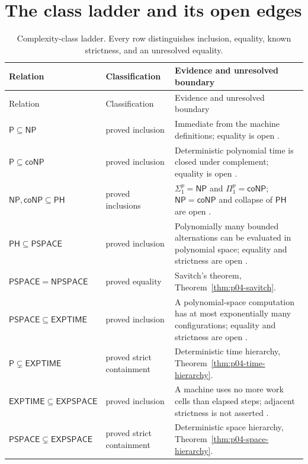 \section{The class ladder and its open edges}
\label{sec:p04-complexity-ladder}

\begingroup\small
\begin{longtable}{@{}p{}p{}p{}@{}}
\caption{Complexity-class ladder.  Every row distinguishes
inclusion, equality, known strictness, and an unresolved equality.}
\label{tab:p04-complexity-ladder}\\
\toprule
Relation & Classification & Evidence and unresolved boundary \\
\midrule
\endfirsthead
\toprule
Relation & Classification & Evidence and unresolved boundary \\
\midrule
\endhead
\bottomrule
\endfoot
\(\mathsf P\subseteq\mathsf{NP}\) & proved inclusion & Immediate from the
machine definitions; equality is open \cite{AroraBarak2009}. \\
\addlinespace
\(\mathsf P\subseteq\mathsf{coNP}\) & proved inclusion & Deterministic
polynomial time is closed under complement; equality is open
\cite{AroraBarak2009}. \\
\addlinespace
\(\mathsf{NP},\mathsf{coNP}\subseteq\mathsf{PH}\) & proved inclusions &
\(\Sigma^p_1=\mathsf{NP}\) and \(\Pi^p_1=\mathsf{coNP}\);
\(\mathsf{NP}=\mathsf{coNP}\) and collapse of \(\mathsf{PH}\) are open
\cite{Stockmeyer1976}. \\
\addlinespace
\(\mathsf{PH}\subseteq\mathsf{PSPACE}\) & proved inclusion & Polynomially
many bounded alternations can be evaluated in polynomial space; equality and
strictness are open \cite[ch.~5]{AroraBarak2009}. \\
\addlinespace
\(\mathsf{PSPACE}=\mathsf{NPSPACE}\) & proved equality & Savitch's theorem,
Theorem~\ref{thm:p04-savitch}. \\
\addlinespace
\(\mathsf{PSPACE}\subseteq\mathsf{EXPTIME}\) & proved inclusion & A
polynomial-space computation has at most exponentially many configurations;
equality and strictness are open \cite[ch.~4]{AroraBarak2009}. \\
\addlinespace
\(\mathsf{P}\subsetneq\mathsf{EXPTIME}\) & proved strict containment &
Deterministic time hierarchy, Theorem~\ref{thm:p04-time-hierarchy}. \\
\addlinespace
\(\mathsf{EXPTIME}\subseteq\mathsf{EXPSPACE}\) & proved inclusion & A
machine uses no more work cells than elapsed steps; adjacent strictness is not
asserted \cite{AroraBarak2009}. \\
\addlinespace
\(\mathsf{PSPACE}\subsetneq\mathsf{EXPSPACE}\) & proved strict containment &
Deterministic space hierarchy, Theorem~\ref{thm:p04-space-hierarchy}. \\
\end{longtable}
\endgroup

